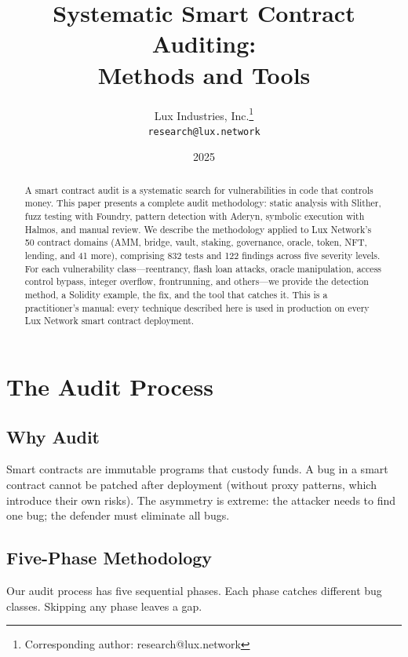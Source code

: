 \documentclass[11pt,a4paper]{article}
\title{Systematic Smart Contract Auditing:\\Methods and Tools}
\author{
Lux Industries, Inc.\thanks{Corresponding author: research@lux.network}\\
\texttt{research@lux.network}
}
\date{2025}
\begin{document}
\luxcoverpage

\begin{abstract}
A smart contract audit is a systematic search for vulnerabilities in code that controls
money. This paper presents a complete audit methodology: static analysis with Slither,
fuzz testing with Foundry, pattern detection with Aderyn, symbolic execution with Halmos,
and manual review. We describe the methodology applied to Lux Network's 50 contract
domains (AMM, bridge, vault, staking, governance, oracle, token, NFT, lending, and 41
more), comprising 832 tests and 122 findings across five severity levels. For each
vulnerability class---reentrancy, flash loan attacks, oracle manipulation, access control
bypass, integer overflow, frontrunning, and others---we provide the detection method,
a Solidity example, the fix, and the tool that catches it. This is a practitioner's manual:
every technique described here is used in production on every Lux Network smart contract
deployment.
\end{abstract}

\tableofcontents
\newpage

\section{The Audit Process}

\subsection{Why Audit}

Smart contracts are immutable programs that custody funds. A bug in a smart contract
cannot be patched after deployment (without proxy patterns, which introduce their own
risks). The asymmetry is extreme: the attacker needs to find one bug; the defender must
eliminate all bugs.

\subsection{Five-Phase Methodology}

Our audit process has five sequential phases. Each phase catches different bug classes.
Skipping any phase leaves a gap.
\end{document}
